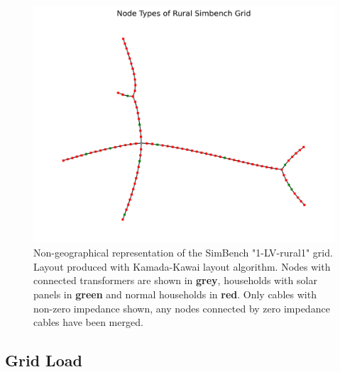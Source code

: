 \begin{figure}[h]
    \includegraphics{img/simbench/layout.png}
    \caption{
        Non-geographical representation of the SimBench "1-LV-rural1"
        grid\autocite{simbench}. Layout produced with
        Kamada-Kawai layout algorithm\autocite{kamada_kawai}.
        Nodes with connected transformers are shown
        in \textbf{grey}, households with solar panels in \textbf{green}
        and normal households in \textbf{red}. Only cables with non-zero impedance shown, any nodes
        connected by zero impedance cables have been merged.
    }
    \label{fig:vep:simbench_node_types}
\end{figure}


\subsection{Grid Load}


